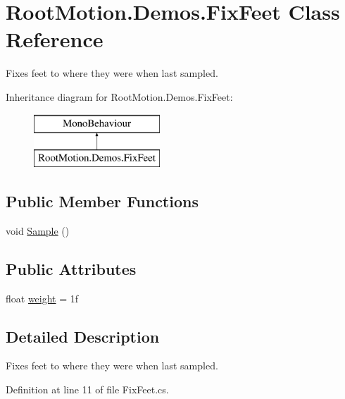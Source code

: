 \hypertarget{class_root_motion_1_1_demos_1_1_fix_feet}{}\section{Root\+Motion.\+Demos.\+Fix\+Feet Class Reference}
\label{class_root_motion_1_1_demos_1_1_fix_feet}


Fixes feet to where they were when last sampled.  


Inheritance diagram for Root\+Motion.\+Demos.\+Fix\+Feet\+:\begin{figure}[H]
\begin{center}
\leavevmode
\includegraphics[height=2.000000cm]{class_root_motion_1_1_demos_1_1_fix_feet}
\end{center}
\end{figure}
\subsection*{Public Member Functions}
\begin{DoxyCompactItemize}
\item 
void \mbox{\hyperlink{class_root_motion_1_1_demos_1_1_fix_feet_a3f194b6419c8dffd47f4f692f42c4665}{Sample}} ()
\end{DoxyCompactItemize}
\subsection*{Public Attributes}
\begin{DoxyCompactItemize}
\item 
float \mbox{\hyperlink{class_root_motion_1_1_demos_1_1_fix_feet_a8946d61f12032b424ff37f1e9a959d0d}{weight}} = 1f
\end{DoxyCompactItemize}


\subsection{Detailed Description}
Fixes feet to where they were when last sampled. 



Definition at line 11 of file Fix\+Feet.\+cs.



